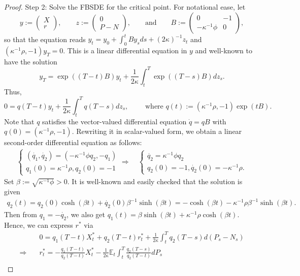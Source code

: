 \documentclass[openany,oneside]{article}
\theoremstyle{definition}
\theoremstyle{remark}
\newcommand{\E}{\mathbb{E}} %
\newcommand{\ts}{\textstyle}
\begin{document}
\begin{proof}
Step 2: Solve the FBSDE for the critical point. For notational ease, let
\[
 y:=\begin{pmatrix} X \\ r\end{pmatrix},\qquad z:=\begin{pmatrix} 0 \\ P-N\end{pmatrix},\qquad\text{and}\qquad B:=\begin{pmatrix} 0 & -1 \\ -\kappa^{-1}\phi & 0\end{pmatrix},
\]
so that the equation reads $y_t = y_0 + \int_0^t B y_s ds + (2\kappa)^{-1}z_t$ and $(\kappa^{-1}\rho, -1)y_T = 0$. This is a linear differential equation in $y$ and well-known to have the solution
\[
\ts y_T = \exp((T-t)B)y_t + \frac{1}{2\kappa} \int_t^T \exp((T-s)B) dz_s.
\]
Thus,
\[
\ts 0 = q(T-t)y_t + \frac{1}{2\kappa}\int_t^T q(T-s) dz_s,\qquad \textrm{ where } q(t):=(\kappa^{-1}\rho, -1)\exp(tB).
\]
Note that $q$ satisfies the vector-valued differential equation $\dot{q}=qB$ with $q(0)=(\kappa^{-1}\rho, -1)$. Rewriting it in scalar-valued form, we obtain a linear second-order differential equation as follows:
\begin{align*}
\begin{cases} (\dot{q_1},\dot{q_2})=(-\kappa^{-1}\phi q_2, -q_1) \\ q_1(0)=\kappa^{-1}\rho, q_2(0)=-1 \end{cases}
\Rightarrow\quad \begin{cases}
\ddot{q_2}=\kappa^{-1}\phi q_2 \\ q_2(0)=-1, \dot{q_2}(0)=-\kappa^{-1}\rho.
\end{cases}
\end{align*}
Set $\beta:=\sqrt{\kappa^{-1}\phi}>0$. It is well-known and easily checked that the solution is given%
\begin{align*}
q_2(t)=q_2(0)\cosh(\beta t)+\dot{q_2}(0)\beta^{-1}\sinh(\beta t) = -\cosh(\beta t)-\kappa^{-1}\rho\beta^{-1}\sinh(\beta t).
\end{align*}
Then from $q_1=-\dot{q_2}$, we also get $q_1(t)=\beta\sinh(\beta t)+\kappa^{-1}\rho\cosh(\beta t)$. Hence, we can express $r^\ast$ via
\begin{align*}
&\ts 0=q_1(T-t)X^\ast_t+q_2(T-t)r^\ast_t+\frac{1}{2\kappa}\int_t^T q_2(T-s) d(P_s-N_s) \\
\Rightarrow\quad &\ts r^\ast_t = -\frac{q_1(T-t)}{q_2(T-t)} X^\ast_t - \frac{1}{2\kappa} \E_t\int_t^T\frac{q_2(T-s)}{q_2(T-t)} dP_s \\

\end{align*}
\end{proof}
\end{document}
